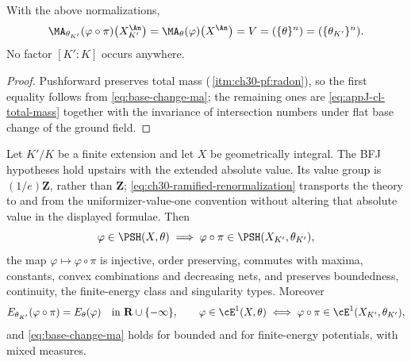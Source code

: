 \begin{corollary}
\label{cor:ch30-base-change-mass}
With the above normalizations,
\begin{equation}
\label{eq:ch30-base-change-mass}
 \MA_{\theta_{K'}}(\varphi\circ\pi)\bigl(X_{K'}^{\An}\bigr)
 =\MA_\theta(\varphi)\bigl(X^{\An}\bigr)=V
 =(\{\theta\}^n)=(\{\theta_{K'}\}^n).
\end{equation}
No factor $[K':K]$ occurs anywhere.
\end{corollary}

\begin{proof}
Pushforward preserves total mass
(\,\cref{itm:ch30-pf:radon}), so the first
equality follows from \eqref{eq:base-change-ma}; the remaining ones are
\eqref{eq:appJ-cl-total-mass} together with the invariance of intersection
numbers under flat base change of the ground field.
\end{proof}

\begin{theorem}
\label{thm:ch30-base-change-psh}
Let $K'/K$ be a finite extension and let $X$ be geometrically integral.
The BFJ hypotheses hold upstairs with the extended absolute value.
Its value group is $(1/e)\mathbf Z$, rather than $\mathbf Z$;
\eqref{eq:ch30-ramified-renormalization} transports the theory to and
from the uniformizer-value-one convention without altering that
absolute value in the displayed formulae.  Then
\begin{equation}
\label{eq:ch30-base-change-psh}
 \varphi\in\PSH(X,\theta)
 \implies
 \varphi\circ\pi\in\PSH(X_{K'},\theta_{K'}),
\end{equation}
the map $\varphi\mapsto\varphi\circ\pi$ is injective, order preserving,
commutes with maxima, constants, convex combinations and decreasing nets,
and preserves boundedness, continuity, the finite-energy class and
singularity types.  Moreover
\begin{equation}
\label{eq:ch30-base-change-e1}
 E_{\theta_{K'}}(\varphi\circ\pi)=E_\theta(\varphi)
 \quad\text{in }\mathbf R\cup\{-\infty\},
 \qquad
 \varphi\in\cE^1(X,\theta)\iff
 \varphi\circ\pi\in\cE^1(X_{K'},\theta_{K'}),
\end{equation}
and \eqref{eq:base-change-ma} holds for bounded and for finite-energy
potentials, with mixed measures.
\end{theorem}

